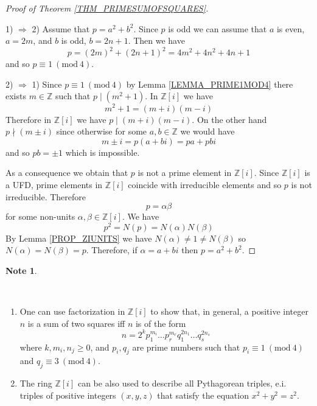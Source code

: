\documentclass[12pt, letterpaper, oneside]{article}
\theoremstyle{plain}
\theoremstyle{definition}
\newtheorem{note}[theorem]{Note}
\newcommand{\Z}{{\mathbb Z}}
\newcommand{\benu}{\begin{enumerate}}
\newcommand{\eenu}{\end{enumerate}}
\newcommand{\vs}{\vskip 5mm}
\begin{document}
\begin{proof}[Proof of Theorem \ref{THM_PRIMESUMOFSQUARES}] \ 
 
1) $\Rightarrow$ 2) Assume that $p = a^{2} + b^{2}$. Since $p$ is odd we can assume 
that $a$ is even, $a= 2m$, and $b$ is odd, $b=2n+1$. 
Then we have 
$$p= (2m)^{2} + (2n+1)^{2} = 4m^{2} + 4n^{2} + 4n +1$$
and so $p\equiv 1 \  (\mathrm{mod} \ 4) $.

\vs\vs

2) $\Rightarrow$ 1)  Since  $p\equiv 1 \  (\mathrm{mod} \ 4) $  by Lemma \ref{LEMMA_PRIME1MOD4}
there exists $m\in \Z$ such that $p\mid (m^{2}+1)$. In $\Z[i]$ we have 
$$m^{2}+1 = (m+i)(m-i)$$
Therefore in $\Z[i]$ we have $p\mid (m+i)(m-i)$. On the other hand $p\nmid (m\pm i)$ since 
otherwise for some $a, b \in \Z$ we would have 
$$m\pm i = p(a+bi) = pa + pbi$$
and so $pb = \pm 1$ which is impossible. 

As a consequence we obtain that $p$ is not a prime element in $\Z[i]$. Since $\Z[i]$ is a UFD,
prime elements in $\Z[i]$ coincide with irreducible elements and so $p$ is not irreducible. 
Therefore
$$p = \alpha\beta$$
for some non-units $\alpha, \beta\in \Z[i]$. We have 
$$p^2 = N(p ) = N(\alpha)N(\beta) $$
By Lemma \ref{PROP_ZIUNITS} we have $N(\alpha)\neq 1 \neq N(\beta)$ so
$N(\alpha) = N(\beta)=p$. Therefore, if $\alpha = a+bi$ then $p = a^2+b^2$.
\end{proof}


\vs\vs



\begin{note}\ 

\vskip -13mm

\ 
\benu
\item One can use factorization in $\Z[i]$ to show that, in general,  a positive integer $n$ is a 
sum of two squares  iff $n$ is of the form 
$$n= 2^{k}p_{1}^{m_{i}}{\dots}p_{r}^{m_{r}}q_{1}^{2n_{1}}{\dots}q_{s}^{2n_{s}}$$
where $k, m_{i}, n_{j} \geq 0$, and $p_{i}, q_{j}$ are prime numbers such that 
$p_{i}\equiv 1 \  (\mathrm{mod} \ 4)$ and $q_{j}\equiv 3 \  (\mathrm{mod} \ 4)$.

\item The ring $\Z[i]$ can be also used to describe all Pythagorean triples, e.i. triples of positive integers
$(x, y, z)$ that satisfy the equation $x^{2}+y^{2}=z^{2}$.
\eenu

\end{note}

\vs\vs
\end{document}
